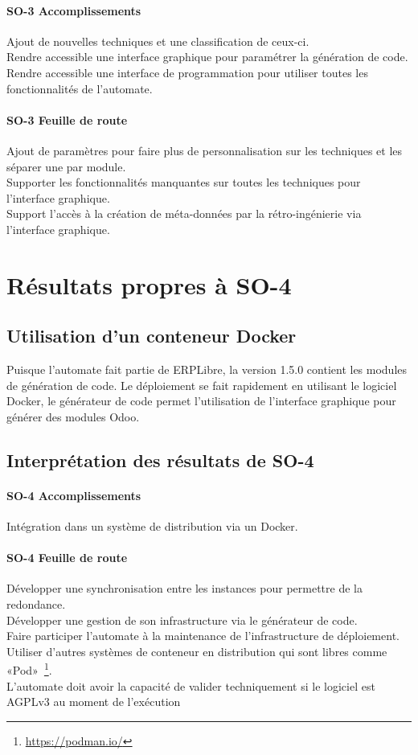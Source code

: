 \paragraph{SO-3 Accomplissements}
Ajout de nouvelles techniques et une classification de ceux-ci.\\
Rendre accessible une interface graphique pour paramétrer la génération de code.\\
Rendre accessible une interface de programmation pour utiliser toutes les fonctionnalités de l’automate.

\paragraph{SO-3 Feuille de route}
Ajout de paramètres pour faire plus de personnalisation sur les techniques et les séparer une par module.\\
Supporter les fonctionnalités manquantes sur toutes les techniques pour l’interface graphique.\\
Support l’accès à la création de méta-données par la rétro-ingénierie via l’interface graphique.

\section{Résultats propres à SO-4}

\subsection{Utilisation d’un conteneur Docker}

Puisque l’automate fait partie de ERPLibre, la version 1.5.0 contient les modules de génération de code. Le déploiement se fait rapidement en utilisant le logiciel Docker, le générateur de code permet l’utilisation de l’interface graphique pour générer des modules Odoo.

\subsection{Interprétation des résultats de SO-4}

\paragraph{SO-4 Accomplissements}
Intégration dans un système de distribution via un Docker.

\paragraph{SO-4 Feuille de route}
Développer une synchronisation entre les instances pour permettre de la redondance.\\
Développer une gestion de son infrastructure via le générateur de code.\\
Faire participer l’automate à la maintenance de l’infrastructure de déploiement.\\
Utiliser d’autres systèmes de conteneur en distribution qui sont libres comme «Pod»~\footnote{\url{https://podman.io/}}.\\
L’automate doit avoir la capacité de valider techniquement si le logiciel est AGPLv3 au moment de l’exécution

